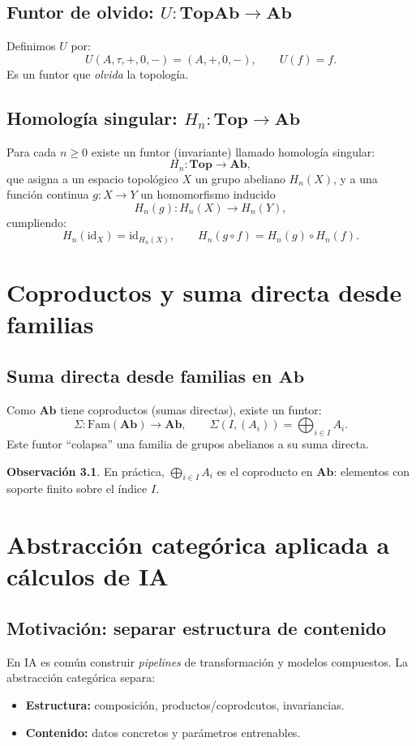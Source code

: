 \documentclass[12pt,oneside]{book}
\theoremstyle{definition}
\newtheorem{remark}{Observación}[chapter]
\begin{document}
\section{Funtor de olvido: \texorpdfstring{$U:\mathbf{TopAb}\to\mathbf{Ab}$}{U:TopAb->Ab}}
Definimos $U$ por:
\[
U(A,\tau,+,0,-)=(A,+,0,-),\qquad U(f)=f.
\]
Es un funtor que \emph{olvida} la topología.

\section{Homología singular: \texorpdfstring{$H_n:\mathbf{Top}\to\mathbf{Ab}$}{Hn:Top->Ab}}
Para cada $n\ge 0$ existe un funtor (invariante) llamado homología singular:
\[
H_n:\mathbf{Top}\to\mathbf{Ab},
\]
que asigna a un espacio topológico $X$ un grupo abeliano $H_n(X)$,
y a una función continua $g:X\to Y$ un homomorfismo inducido
\[
H_n(g):H_n(X)\to H_n(Y),
\]
cumpliendo:
\[
H_n(\mathrm{id}_X)=\mathrm{id}_{H_n(X)},\qquad
H_n(g\circ f)=H_n(g)\circ H_n(f).
\]

\chapter{Coproductos y suma directa desde familias}
\label{chap:suma-directa}

\section{Suma directa desde familias en \texorpdfstring{$\mathbf{Ab}$}{Ab}}
Como $\mathbf{Ab}$ tiene coproductos (sumas directas), existe un funtor:
\[
\Sigma:\mathrm{Fam}(\mathbf{Ab})\to\mathbf{Ab},\qquad
\Sigma(I,(A_i))=\bigoplus_{i\in I} A_i.
\]
Este funtor ``colapsa'' una familia de grupos abelianos a su suma directa.

\begin{remark}
En práctica, $\bigoplus_{i\in I} A_i$ es el coproducto en $\mathbf{Ab}$:
elementos con soporte finito sobre el índice $I$.
\end{remark}

\chapter{Abstracción categórica aplicada a cálculos de IA}
\label{chap:cat-ia}

\section{Motivación: separar estructura de contenido}
En IA es común construir \emph{pipelines} de transformación y modelos compuestos.
La abstracción categórica separa:
\begin{itemize}[leftmargin=1.5em]
  \item \textbf{Estructura:} composición, productos/coprodcutos, invariancias.
  \item \textbf{Contenido:} datos concretos y parámetros entrenables.
\end{itemize}
\end{document}
